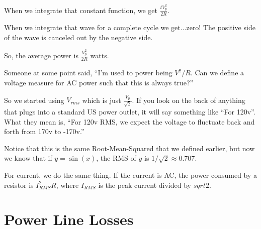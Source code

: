     
When we integrate that constant function, we get $\frac{t V_p^2}{2R}$.

When we integrate that wave for a complete cycle we get...zero! The
positive side of the wave is canceled out by the negative side.

So, the average power is $\frac{V_p^2}{2R}$ watts.

Someone at some point said, ``I'm used to power being $V^2/R$. Can
we define a voltage measure for AC power such that this is always true?''

So we started using $V_{rms}$ which is just
$\frac{V_p}{\sqrt{2}}$. If you look on the back of anything that plugs
into a standard US power outlet, it will say something like ``For
120v''.  What they mean is, ``For 120v RMS, we expect the voltage to
fluctuate back and forth from 170v to -170v.''

Notice that this is the same Root-Mean-Squared that we defined
earlier, but now we know that if $y = \sin(x)$, the RMS of $y$ is
$1/\sqrt{2} \approx 0.707$.

For current, we do the same thing. If the current is AC, the power
consumed by a resistor is $I_{RMS}^2 R$, where $I_{RMS}$ is the peak
current divided by $sqrt{2}$.

\section{Power Line Losses}

